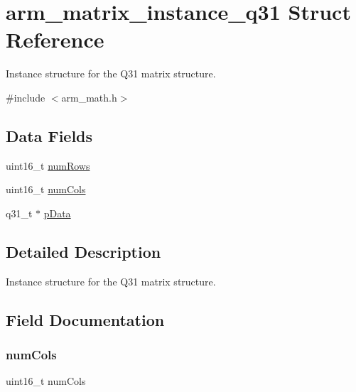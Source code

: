\hypertarget{structarm__matrix__instance__q31}{}\section{arm\+\_\+matrix\+\_\+instance\+\_\+q31 Struct Reference}
\label{structarm__matrix__instance__q31}


Instance structure for the Q31 matrix structure.  




{\ttfamily \#include $<$arm\+\_\+math.\+h$>$}

\subsection*{Data Fields}
\begin{DoxyCompactItemize}
\item 
uint16\+\_\+t \mbox{\hyperlink{structarm__matrix__instance__q31_a1bcf80ccdc2acc29198f1592ae300390}{num\+Rows}}
\item 
uint16\+\_\+t \mbox{\hyperlink{structarm__matrix__instance__q31_a4bb5ec0d13eb4c9cf887aa8366a44117}{num\+Cols}}
\item 
q31\+\_\+t $\ast$ \mbox{\hyperlink{structarm__matrix__instance__q31_ad296f76577326ff280726323536eed6d}{p\+Data}}
\end{DoxyCompactItemize}


\subsection{Detailed Description}
Instance structure for the Q31 matrix structure. 

\subsection{Field Documentation}
\mbox{\label{structarm__matrix__instance__q31_a4bb5ec0d13eb4c9cf887aa8366a44117}} 
\subsubsection{\texorpdfstring{num\+Cols}{numCols}}
{\footnotesize\ttfamily uint16\+\_\+t num\+Cols}

